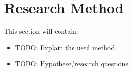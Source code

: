\documentclass[../main.tex]{subfiles}
\begin{document}
    \section{Research Method}\label{sec:research_method}
    This section will contain:
    \begin{itemize}
        \item TODO: Explain the used method. %
        \item TODO: Hypothese/research questions %
    \end{itemize}
\end{document}
